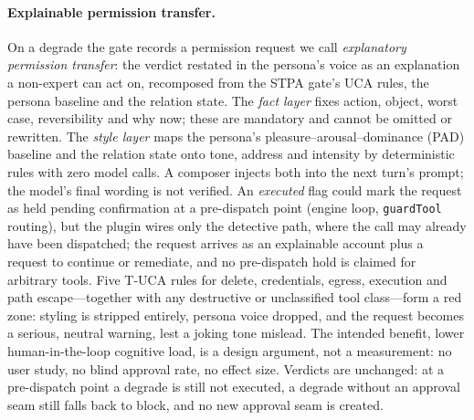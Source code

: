 \paragraph{Explainable permission transfer.} On a degrade the gate records a
permission request we call \emph{explanatory permission transfer}: the verdict
restated in the persona's voice as an explanation a non-expert can act on,
recomposed from the STPA gate's UCA rules, the persona baseline and the relation
state. The \emph{fact layer} fixes action, object, worst case, reversibility and
why now; these are mandatory and cannot be omitted or rewritten. The \emph{style
layer} maps the persona's pleasure--arousal--dominance (PAD) baseline and the
relation state onto tone, address and intensity by deterministic rules with zero
model calls. A composer injects both into the next turn's prompt; the model's
final wording is not verified. An \emph{executed} flag could mark the request as
held pending confirmation at a pre-dispatch point (engine loop,
\texttt{guardTool} routing), but the plugin wires only the detective path, where
the call may already have been dispatched; the request arrives as an explainable
account plus a request to continue or remediate, and no pre-dispatch hold is
claimed for arbitrary tools. Five T-UCA rules for delete, credentials, egress,
execution and path escape---together with any destructive or unclassified tool
class---form a red zone: styling is stripped entirely, persona
voice dropped, and the request becomes a serious, neutral warning, lest a joking
tone mislead. The intended benefit, lower human-in-the-loop cognitive load, is a
design argument, not a measurement: no user study, no blind approval rate, no
effect size. Verdicts are unchanged: at a pre-dispatch point a degrade is still
not executed, a degrade without an approval seam still falls back to block, and
no new approval seam is created.

